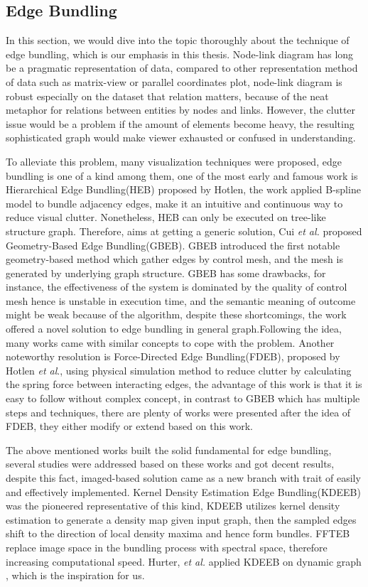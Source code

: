 \documentclass{article}
\begin{document}
\subsection{Edge Bundling}
In this section, we would dive into the topic thoroughly about the technique of edge bundling, which is our emphasis in this thesis. Node-link diagram has long be a pragmatic representation of data, compared to other representation method of data such as matrix-view or parallel coordinates plot, node-link diagram is robust especially on the dataset that relation matters, because of the neat metaphor for relations between entities by nodes and links. However, the clutter issue would be a problem if the amount of elements become heavy, the resulting sophisticated graph would make viewer exhausted or confused in understanding. 
\par
To alleviate this problem, many visualization techniques were proposed, edge bundling is one of a kind among them, one of the most early and famous work is Hierarchical Edge Bundling(HEB)\cite{HEB} proposed by Hotlen, the work applied B-spline\cite{BSpline} model to bundle adjacency edges, make it an intuitive and continuous way to reduce visual clutter. Nonetheless, HEB can only be executed on tree-like structure graph. Therefore, aims at getting a generic solution, Cui \emph{et al.} proposed Geometry-Based Edge Bundling(GBEB)\cite{GBEB}. GBEB introduced the first notable geometry-based method which gather edges by control mesh, and the mesh is generated by underlying graph structure. GBEB has some drawbacks, for instance, the effectiveness of the system is dominated by the quality of control mesh hence is unstable in execution time, and the semantic meaning of outcome might be weak because of the algorithm, despite these shortcomings, the work offered a novel solution to edge bundling in general graph.Following the idea, many works came with similar concepts to cope with the problem\cite{WindingRoad,EBEB,GEOREF,CBEB}. Another noteworthy resolution is Force-Directed Edge Bundling(FDEB)\cite{FDEB}, proposed by Hotlen \emph{et al}., using physical simulation method to reduce clutter by calculating the spring force between interacting edges, the advantage of this work is that it is easy to follow without complex concept, in contrast to GBEB which has multiple steps and techniques, there are plenty of works were presented after the idea of FDEB\cite{3DFDEB,TGIEB,StreamEB}, they either modify or extend based on this work. 
\par 
The above mentioned works built the solid fundamental for edge bundling, several studies were addressed based on these works and got decent results, despite this fact, imaged-based solution\cite{Skeleton,FFTEB,Smooth} came as a new branch with trait of easily and effectively implemented. Kernel Density Estimation Edge Bundling(KDEEB)\cite{KDEEB} was the pioneered representative of this kind, KDEEB utilizes kernel density estimation to generate a density map given input graph, then the sampled edges shift to the direction of local density maxima and hence form bundles. FFTEB\cite{FFTEB} replace image space in the bundling process with spectral space, therefore increasing computational speed. Hurter, \emph{et al.} applied KDEEB on dynamic graph \cite{Smooth}, which is the inspiration for us.
\end{document}
